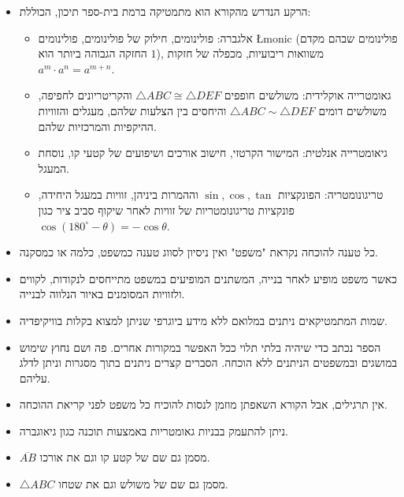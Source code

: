 \begin{itemize}
\item
הרקע הנדרש מהקורא הוא מתמטיקה ברמת בית-ספר תיכון, הכוללת:

\begin{itemize}
\item
אלגברה: פולינומים, חילוק של פולינומים, פולינומים 
\L{monic}
(פולינומים שבהם מקדם החזקה הגבוהה ביותר הוא $1$), משוואות ריבועיות, מכפלה של חזקות 
$a^m\cdot a^n=a^{m+n}$.

\item
גאומטרייה אוקלידית: משולשים חופפים 
$\triangle ABC \cong \triangle DEF$
והקריטריונים לחפיפה, משולשים דומים
$\triangle ABC \sim \triangle DEF$
והיחסים בין הצלעות שלהם, מעגלים והזוויות ההיקפיות והמרכזיות שלהם.

\item
גיאומטרייה אנלטית: המישור הקרטזי, חישוב אורכים ושיפועים של קטעי קו, נוסחת המעגל.

\item
טריגונומטריה: הפונקציות 
$\sin,\cos,\tan$
וההמרות ביניהן, זוויות במעגל היחידה, פונקציות טריגונומטריות של זוויות לאחר שיקוף סביב ציר כגון
$\cos (180^\circ-\theta)=-\cos\theta$.
\end{itemize}

\item
כל טענה להוכחה נקראת "משפט" ואין ניסיון לסווג טענה כמשפט, כלמה או כמסקנה.

\item
כאשר משפט מופיע לאחר בנייה, המשתנים המופיעים במשפט מתייחסים לנקודות, לקווים ולזוויות המסומנים באיור הנלווה לבנייה.

\item
שמות המתמטיקאים ניתנים במלואם ללא מידע ביוגרפי שניתן למצוא בקלות בוויקיפדיה.

\item
הספר נכתב כדי שיהיה בלתי תלוי ככל האפשר במקורות אחרים. פה ושם נחוץ שימוש במושגים ובמשפטים הניתנים ללא הוכחה. הסברים קצרים ניתנים בתוך מסגרות וניתן לדלג עליהם.

\item
אין תרגילים, אבל הקורא השאפתן מוזמן לנסות להוכיח כל משפט לפני קריאת ההוכחה.

\item
ניתן להתעמק בבניות גאומטריות באמצעות תוכנה כגון גיאוגברה.

\item
$\overline{AB}$
מסמן גם שם של קטע קו וגם את אורכו.

\item
$\triangle ABC$
מסמן גם שם של משולש וגם את שטחו.
\end{itemize}

